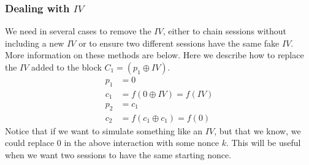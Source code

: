 \documentclass{llncs}
\newcommand{\ignore}[1]{}
\begin{document}
\subsubsection{Dealing with $IV$}\label{sec_iv}
We need in several cases to remove the $IV$, either to chain 
sessions without including a new $IV$ or to ensure two 
different sessions have the same fake $IV$. More information on these methods are below. Here we describe how to replace the $IV$ added
to the block $C_1 = (p_1 \oplus IV)$. 
\begin{align*}
	p_1 &= 0\\
	c_1 &= f(0 \oplus IV) = f(IV)\\
	p_2 &= c_1\\
	c_2 &= f(c_1 \oplus c_1) = f(0)
\end{align*}
Notice that if we want to simulate something like an $IV$, but
that we know, we could replace $0$ in the above interaction 
with some nonce $k$. This will be useful when we want two 
sessions to have the same starting nonce. 

\ignore{
\subsection{$MOE_A$ Decision Problems} 
\begin{conjecture}
	Given a signature $\Sigma=\{
	\oplus, f\}$, where $\oplus$ is associative, the $CBC$ MOE, the immediate  schedule, unbounded sessions, and unbounded session 
	length.  The $MOE_A$ decision problem is undecidable.
\end{conjecture}\todo[inline]{Andrew: This is really just a proof sketch and we will need to make sure there isn't a problem.}
\begin{proof}
	Reduction from the PCP. Since $\oplus$ is just $A$ we can directly
	model string by chaining the symbols together via $\oplus$.
	
	For a PCP the adversary starts two classes of sessions. 
	The first class consists of a session for each of the string
	in the upper part of the PCP problem, $A_1, A_2, \ldots, A_n$.
	The second class consists of a session for each of the strings
	in the lower part of the PCP problems, $B_1, B_2, \ldots, B_n$.
	
	The adversary simulates each possible index (and thus possible PCP
	solution) by creating a session for each index in each class, A and B. To ensure each session in A are only unified with index in B
	the adversary uses a unique IV for each index in A that matches the same index in B. 
	
	Since there is in bound on the session length
	or the number of sessions if there is a solution, the index of that
	solution in the A set of index will be unified with the same index in the B set. Since unification is modulo $A$ there is then a solution to the PCP problem.  
\end{proof}
}
\end{document}
